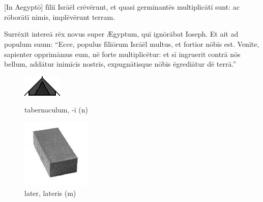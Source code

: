 \chapter{}


\thispagestyle{empty}


    [In Aegyptō] fīliī Isrāēl crēvērunt, et quasi germinantēs multiplicātī sunt:
ac rōborātī nimis, implēvērunt terram.

Surrēxit intereā rēx novus super Ægyptum, quī ignōrābat Ioseph.
Et ait ad populum suum: ``Ecce, populus fīliōrum Isrāēl multus, et fortior nōbīs est.
Venīte, sapien\-ter opprimāmus eum, nē forte multiplicētur: et sī ingruerit contrā nōs bellum, addātur inimīcīs nostrīs, expugnātisque nōbīs ēgrediātur dē terrā.''

\begin{figure}[h]
    \begin{minipage}[h]{0.5\linewidth}
        \centering
        \includegraphics{tab}
        \caption{tabernaculum, -ī (n)}
    \end{minipage}%
    \begin{minipage}[h]{0.5\linewidth}
        \vspace*{-0.3cm}
        \centering
        \includegraphics{later}
        \vspace*{-0.425cm}
        \caption{later, lateris (m)}
    \end{minipage}
\end{figure}

